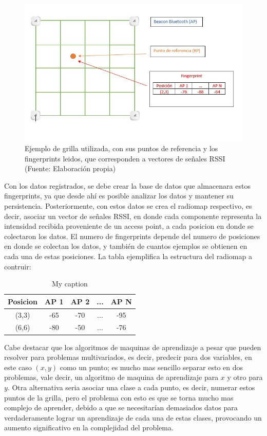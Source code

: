 \begin{figure}[ht!]
\centering
\includegraphics[width=.6\textwidth]{figures/fingerprints.jpg}
\caption[abs]{Ejemplo de grilla utilizada, con sus puntos de referencia y los fingerprints leidos, que corresponden a vectores de señales RSSI\\
{\scriptsize (Fuente: Elaboración propia)}}
\label{fig:fingerprints}
\end{figure}

Con los datos registrados, se debe crear la base de datos que almacenara estos fingerprints, ya que desde ahí es posible analizar los datos y mantener su persistencia. Posteriormente, con estos datos se crea el radiomap respectivo, es decir, asociar un vector de señales RSSI, en donde cada componente representa la intensidad recibida proveniente de un access point, a cada posicion en donde se colectaron los datos. El numero de fingerprints depende del numero de posiciones en donde se colectan los datos, y también de cuantos ejemplos se obtienen en cada una de estas posiciones. La tabla ejemplifica la estructura del radiomap a contruir:

\begin{table}[]
\centering
\caption{My caption}
\label{my-label}
\begin{tabular}{|c|c|c|c|c|}
\hline
Posicion & AP 1 & AP 2 & ... & AP N \\ \hline
(3,3)    & -65  & -70  & ... & -95  \\ \hline
(6,6)    & -80  & -50  & ... & -76  \\ \hline
\end{tabular}
\end{table}

Cabe destacar que los algoritmos de maquinas de aprendizaje a pesar que pueden resolver para problemas multivariados, es decir, predecir para dos variables, en este caso $(x,y)$ como un punto; es mucho mas sencillo separar esto en dos problemas, vale decir, un algoritmo de maquina de aprendizaje para $x$ y otro para $y$. Otra alternativa seria asociar una clase a cada punto, es decir, numerar estos puntos de la grilla, pero el problema con esto es que se torna mucho mas complejo de aprender, debido a que se necesitarían demasiados datos para verdaderamente lograr un aprendizaje de cada una de estas clases, provocando un aumento significativo en la complejidad del problema.

